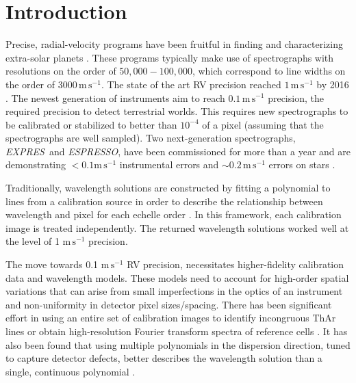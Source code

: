 \documentclass[twocolumn,table,xcolor,trackchanges]{aastex63}
\newcommand{\project}[1]{\textsl{#1}}
\newcommand{\acronym}[1]{{\small{#1}}}
\newcommand{\expres}{\project{\acronym{EXPRES}}}
\newcommand{\espresso}{\project{\acronym{ESPRESSO}}}
\newcommand{\mps}{\mathrm{m\,s^{-1}}}
\begin{document}
\section{Introduction} 
Precise, radial-velocity programs have been fruitful in finding and characterizing extra-solar planets \citep[e.g.][]{mayor2011, bonfils2013, plavchan2015, butler2017}.  These programs typically make use of spectrographs with resolutions on the order of $50,000-100,000$, which correspond to line widths on the order of $3000\,\mps$.  The state of the art RV precision reached $1\, \mps$ by 2016 \citep{fischer2016}.  The newest generation of instruments aim  to reach $0.1\,\mps$ precision, the required precision to detect terrestrial worlds.  This requires new spectrographs to be calibrated or stabilized to better than $10^{-4}$ of a pixel (assuming that the spectrographs are well sampled).  Two next-generation spectrographs, \expres\ and \espresso, have been commissioned for more than a year and are demonstrating $<0.1 \mps$ instrumental errors and $\sim 0.2\, \mps$ errors on stars \citep{pepe2013, jurgenson2016, blackman2020, petersburg2020, brewer2020, mascareno2020}.

Traditionally, wavelength solutions are constructed by fitting a polynomial to lines from a calibration source in order to describe the relationship between wavelength and pixel for each echelle order \citep{butler1996, lovis2007, cersullo2019}.  In this framework, each calibration image is treated independently.  The returned wavelength solutions worked well at the level of 1 $\mps$ precision.

The move towards 0.1 $\mps$ RV precision, necessitates higher-fidelity calibration data and wavelength models.  These models need to account for high-order spatial variations that can arise from small imperfections in the optics of an instrument and non-uniformity in detector pixel sizes/spacing.  There has been significant effort in using an entire set of calibration images to identify incongruous ThAr lines \citep{coffinet2019} or obtain high-resolution Fourier transform spectra of reference cells \citep{wang2020}.  It has also been found that using multiple polynomials in the dispersion direction, tuned to capture detector defects, better describes the wavelength solution than a single, continuous polynomial \citep{milakovic2020}.
\end{document}

